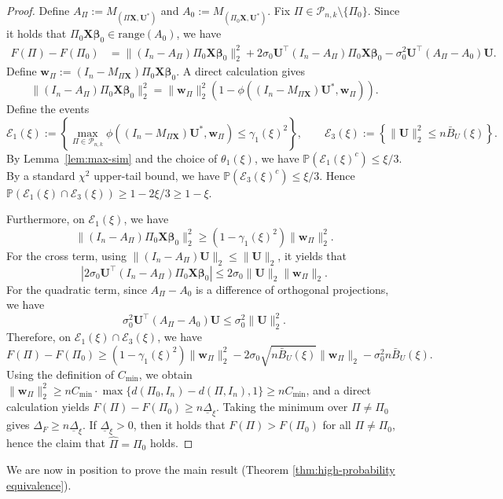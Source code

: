 \documentclass[11pt, reqno]{amsart}
\newcommand{\bP}{\mathbb{P}}
\renewcommand{\hat}{\widehat}
\renewcommand{\le}{\leqslant}
\renewcommand{\ge}{\geqslant}
\newcommand{\mP}{\mathcal{P}}
\newcommand{\1}{\mbox{1}\hspace{-0.25em}\mbox{l}}
\theoremstyle{definition}\newtheorem{problem}{Problem}[section]
\theoremstyle{definition}\newtheorem{definition}[problem]{Definition}
\theoremstyle{remark}\newtheorem{assumption}{Assumption}
\theoremstyle{remark}\newtheorem{remark}[problem]{Remark}
\theoremstyle{definition}\newtheorem{example}[problem]{Example}
\theoremstyle{plain}\newtheorem{theorem}[problem]{Theorem}
\theoremstyle{plain}\newtheorem{question}[problem]{Question}
\theoremstyle{plain}\newtheorem{lemma}[problem]{Lemma}
\theoremstyle{plain}\newtheorem{proposition}[problem]{Proposition}
\theoremstyle{plain}\newtheorem{corollary}[problem]{Corollary}
\theoremstyle{plain}\newtheorem{conjecture}[problem]{Conjecture}
\begin{document}
\begin{proof}
Define $A_\Pi := M_{(\Pi\bm X,\bm U^*)}$ and $A_0:=M_{(\Pi_0\bm X,\bm U^*)}$.
Fix $\Pi\in\mP_{n,k}\setminus\{\Pi_0\}$.
Since it holds that $\Pi_0\bm X\bm\beta_0\in \mathrm{range}(A_0)$, we have
\begin{align*}
F(\Pi)-F(\Pi_0)
&=\|(I_n-A_\Pi)\Pi_0\bm X\bm\beta_0\|_2^2
+2\sigma_0\bm U^\top (I_n-A_\Pi)\Pi_0\bm X\bm\beta_0
-\sigma_0^2 \bm U^\top (A_\Pi-A_0)\bm U.
\end{align*}
Define $\bm w_\Pi:=(I_n-M_{\Pi\bm X})\Pi_0\bm X\bm\beta_0$.
A direct calculation gives
\[
\|(I_n-A_\Pi)\Pi_0\bm X\bm\beta_0\|_2^2
=\|\bm w_\Pi\|_2^2\left(1-\phi\left((I_n-M_{\Pi\bm X})\bm U^*,\bm w_\Pi\right)\right).
\]
Define the events
\[
\mathcal{E}_1(\xi):=\left\{\max_{\Pi\in\mP_{n,k}}
\phi\left((I_n-M_{\Pi\bm X})\bm U^*,\bm w_\Pi\right)\le \gamma_1(\xi)^2\right\},
\qquad
\mathcal{E}_3(\xi):=\left\{\|\bm U\|_2^2\le n\bar B_U(\xi)\right\}.
\]
By Lemma~\ref{lem:max-sim} and the choice of $\theta_1(\xi)$, we have
$\bP(\mathcal{E}_1(\xi)^c)\le \xi/3$.
By a standard $\chi^2$ upper-tail bound, we have
$\bP(\mathcal{E}_3(\xi)^c)\le \xi/3$.
Hence $\bP(\mathcal{E}_1(\xi)\cap \mathcal{E}_3(\xi))\ge 1-2\xi/3\ge 1-\xi$.

Furthermore, on $\mathcal{E}_1(\xi)$, we have
\[
\|(I_n-A_\Pi)\Pi_0\bm X\bm\beta_0\|_2^2\ge (1-\gamma_1(\xi)^2)\|\bm w_\Pi\|_2^2.
\]
For the cross term, using $\|(I_n-A_\Pi)\bm U\|_2\le \|\bm U\|_2$, it yields that
\[
\left|2\sigma_0\bm U^\top (I_n-A_\Pi)\Pi_0\bm X\bm\beta_0\right|
\le 2\sigma_0\|\bm U\|_2\|\bm w_\Pi\|_2.
\]
For the quadratic term, since $A_\Pi-A_0$ is a difference of orthogonal projections, we have
\[
\sigma_0^2 \bm U^\top (A_\Pi-A_0)\bm U
\le \sigma_0^2 \|\bm U\|_2^2.
\]
Therefore, on $\mathcal{E}_1(\xi)\cap \mathcal{E}_3(\xi)$, we have
\[
F(\Pi)-F(\Pi_0)
\ge (1-\gamma_1(\xi)^2)\|\bm w_\Pi\|_2^2
-2\sigma_0\sqrt{n\bar B_U(\xi)}\|\bm w_\Pi\|_2
-\sigma_0^2 n\bar B_U(\xi).
\]
Using the definition of $C_{\min}$, we obtain
$\|\bm w_\Pi\|_2^2\ge n C_{\min}\cdot \max\{d(\Pi_0,I_n)-d(\Pi,I_n),1\}\ge nC_{\min}$,
and a direct calculation yields
$F(\Pi)-F(\Pi_0)\ge n\underline\Delta_\xi$.
Taking the minimum over $\Pi\neq \Pi_0$ gives $\Delta_F\ge n\underline\Delta_\xi$.
If $\underline\Delta_\xi>0$, then it holds that $F(\Pi)>F(\Pi_0)$ for all $\Pi\neq \Pi_0$, hence the claim that $\hat\Pi=\Pi_0$ holds.
\end{proof}




We are now in position to prove the main result (Theorem \ref{thm:high-probability equivalence}). 
\end{document}
